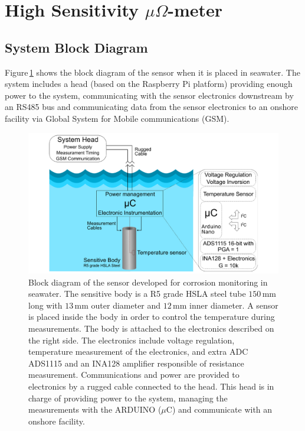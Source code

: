 \documentclass[journal,twoside,web]{ieeecolor}
\begin{document}
\section{High Sensitivity $\mu\Omega$-meter}
\label{sec:corrsens}
\subsection{System Block Diagram}
\label{ssec:sysBlockD}
Figure\,\ref{fig:senBlockD} shows the block diagram of the sensor when it is placed in seawater. The system includes a head (based on the Raspberry Pi platform) providing enough power to the system, communicating with the sensor electronics downstream by an RS485 bus and communicating data from the sensor electronics to an onshore facility via Global System for Mobile communications (GSM).

\begin{figure}[!t]
\centering
\includegraphics [trim = 25mm 0mm 25mm 0mm, clip, width=1\columnwidth]{images/fig1_v2.pdf}
\caption{Block diagram of the sensor developed for corrosion monitoring in seawater. The sensitive body is a R5 grade HSLA steel tube $150$\,mm long with $13$\,mm outer diameter and $12$\,mm inner diameter. A sensor is placed inside the body in order to control the temperature during measurements. The body is attached to the electronics described on the right side. The electronics include voltage regulation, temperature measurement of the electronics, and extra ADC ADS1115 and an INA128 amplifier responsible of resistance measurement. Communications and power are provided to electronics by a rugged cable connected to the head. This head is in charge of providing power to the system, managing the measurements with the ARDUINO ($\mu$C) and communicate with an onshore facility.}
\label{fig:senBlockD}
\vspace{-0.3cm}
\end{figure}
\end{document}
